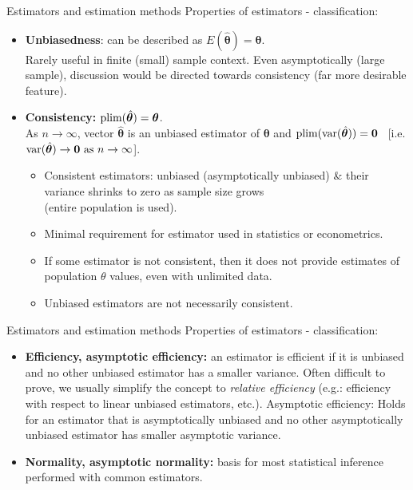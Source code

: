 \documentclass{beamer}
\begin{document}
\begin{frame}{Estimators and estimation methods}
Properties of estimators - classification:
\medskip
\begin{itemize}
\item \textbf{Unbiasedness}: can be described as $E(\hat{\bm{\theta}})= \bm{\theta}$. \\Rarely useful in finite (small) sample context. Even asymptotically (large sample), discussion would be directed towards consistency (far more desirable feature).
\medskip
\item \textbf{Consistency:} $\textnormal{plim}(\hat{\bm{\theta}}) = \bm{\theta}$. \\
As $n \rightarrow \infty$, vector $\hat{\bm{\theta}}$ is an unbiased estimator of $\bm{\theta}$ and $\textnormal{plim}(\textnormal{var}(\hat{\bm{\theta}}))=\bm{0}$ ~[i.e. $\textnormal{var}(\hat{\bm{\theta}}) \rightarrow \bm{0} \textnormal{ as } n \rightarrow \infty$].
\begin{itemize}
\item Consistent estimators: unbiased (asymptotically unbiased) \& their variance shrinks to zero as sample size grows \\(entire population is used).
\item Minimal requirement for estimator used in statistics or econometrics.
\item If some estimator is not consistent, then it does not provide estimates of population $\theta$ values, even with unlimited data.
\item Unbiased estimators are not necessarily consistent. 
\end{itemize}
\end{itemize}
\end{frame}
\begin{frame}{Estimators and estimation methods}
Properties of estimators - classification:
\medskip
\begin{itemize}
\item \textbf{Efficiency, asymptotic efficiency:} an estimator is efficient if it is unbiased and no other unbiased estimator has a smaller variance. Often difficult to prove, we usually simplify the concept to \textit{relative efficiency} (e.g.: efficiency with respect to linear unbiased estimators, etc.). Asymptotic efficiency: Holds for an estimator that is asymptotically unbiased and no other asymptotically unbiased estimator has smaller asymptotic variance.
\medskip
\item \textbf{Normality, asymptotic normality:} basis for most statistical inference performed with common estimators. 
\end{itemize}
\end{frame}
\end{document}
